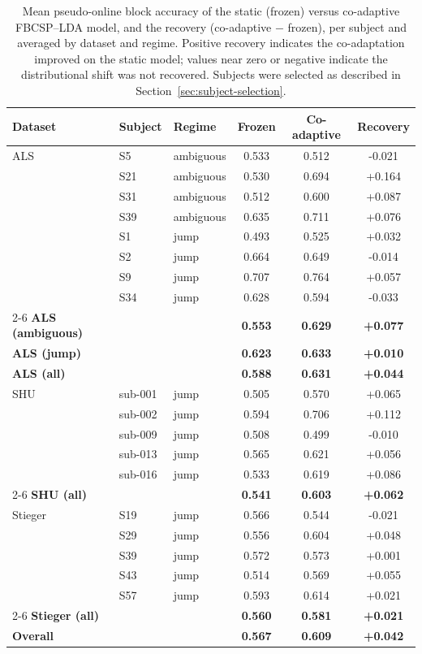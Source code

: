 \begin{table}[htbp]
  \centering
  \caption{Mean pseudo-online block accuracy of the static (frozen) versus co-adaptive FBCSP--LDA model, and the recovery (co-adaptive $-$ frozen), per subject and averaged by dataset and regime. Positive recovery indicates the co-adaptation improved on the static model; values near zero or negative indicate the distributional shift was not recovered. Subjects were selected as described in Section~\ref{sec:subject-selection}.}
  \label{tab:coadapt-summary}
  \begin{tabular}{lllccc}
    \toprule
    Dataset & Subject & Regime & Frozen & Co-adaptive & Recovery \\
    \midrule
    ALS & S5 & ambiguous & 0.533 & 0.512 & -0.021 \\
     & S21 & ambiguous & 0.530 & 0.694 & +0.164 \\
     & S31 & ambiguous & 0.512 & 0.600 & +0.087 \\
     & S39 & ambiguous & 0.635 & 0.711 & +0.076 \\
     & S1 & jump & 0.493 & 0.525 & +0.032 \\
     & S2 & jump & 0.664 & 0.649 & -0.014 \\
     & S9 & jump & 0.707 & 0.764 & +0.057 \\
     & S34 & jump & 0.628 & 0.594 & -0.033 \\
    \cmidrule(l){2-6}
    \textbf{ALS (ambiguous)} & & & \textbf{0.553} & \textbf{0.629} & \textbf{+0.077} \\
    \textbf{ALS (jump)} & & & \textbf{0.623} & \textbf{0.633} & \textbf{+0.010} \\
    \textbf{ALS (all)} & & & \textbf{0.588} & \textbf{0.631} & \textbf{+0.044} \\
    \midrule
    SHU & sub-001 & jump & 0.505 & 0.570 & +0.065 \\
     & sub-002 & jump & 0.594 & 0.706 & +0.112 \\
     & sub-009 & jump & 0.508 & 0.499 & -0.010 \\
     & sub-013 & jump & 0.565 & 0.621 & +0.056 \\
     & sub-016 & jump & 0.533 & 0.619 & +0.086 \\
    \cmidrule(l){2-6}
    \textbf{SHU (all)} & & & \textbf{0.541} & \textbf{0.603} & \textbf{+0.062} \\
    \midrule
    Stieger & S19 & jump & 0.566 & 0.544 & -0.021 \\
     & S29 & jump & 0.556 & 0.604 & +0.048 \\
     & S39 & jump & 0.572 & 0.573 & +0.001 \\
     & S43 & jump & 0.514 & 0.569 & +0.055 \\
     & S57 & jump & 0.593 & 0.614 & +0.021 \\
    \cmidrule(l){2-6}
    \textbf{Stieger (all)} & & & \textbf{0.560} & \textbf{0.581} & \textbf{+0.021} \\
    \midrule
    \textbf{Overall} & & & \textbf{0.567} & \textbf{0.609} & \textbf{+0.042} \\
    \bottomrule
  \end{tabular}
\end{table}
